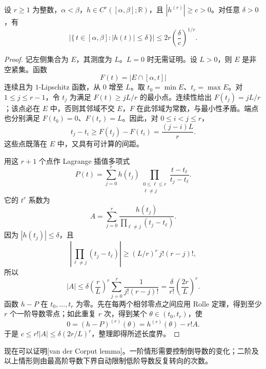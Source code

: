 \begin{lemma}[次水平集的长度]\label{b2:lem:21-sublevel-measure}
设 \(r\geq1\) 为整数，\(\alpha<\beta\)，\(h\in C^r([\alpha,\beta];\mathbb R)\)，且 \(|h^{(r)}|\geq c>0\)。对任意 \(\delta>0\)，有
\[
 \left|\{\,t\in[\alpha,\beta]:|h(t)|\leq\delta\,\}\right|
 \leq 2r\left(\frac{\delta}{c}\right)^{1/r}.
\]
\end{lemma}
\begin{proof}
记左侧集合为 \(E\)，其测度为 \(L\)。\(L=0\) 时无需证明。设 \(L>0\)，则 \(E\) 是非空紧集。函数
\[
 F(t)=|E\cap[\alpha,t]|
\]
连续且为 \(1\)-Lipschitz 函数，从 \(0\) 增至 \(L\)。取 \(t_0=\min E\)、\(t_r=\max E\)。对 \(1\leq j\leq r-1\)，令 \(t_j\) 为满足 \(F(t)\geq jL/r\) 的最小点。连续性给出 \(F(t_j)=jL/r\)；该点必在 \(E\) 中，否则其邻域不交 \(E\)，\(F\) 在此邻域为常数，与最小性矛盾。端点也分别满足 \(F(t_0)=0\)、\(F(t_r)=L\)。因此，对 \(0\leq i<j\leq r\)，
\[
 t_j-t_i\geq F(t_j)-F(t_i)=\frac{(j-i)L}{r}.
\]
这些点既落在 \(E\) 中，又具有可计算的间距。

用这 \(r+1\) 个点作 Lagrange 插值多项式
\[
 P(t)=\sum_{j=0}^r h(t_j)
       \prod_{\substack{0\leq\ell\leq r\\\ell\ne j}}
       \frac{t-t_\ell}{t_j-t_\ell}.
\]
它的 \(t^r\) 系数为
\[
 A=\sum_{j=0}^r
       \frac{h(t_j)}
       {\prod_{\ell\ne j}(t_j-t_\ell)}.
\]
因为 \(|h(t_j)|\leq\delta\)，且
\[
 \left|\prod_{\ell\ne j}(t_j-t_\ell)\right|
 \geq (L/r)^r\,j!(r-j)!,
\]
所以
\[
 |A|
 \leq\delta\left(\frac rL\right)^r
       \sum_{j=0}^r\frac1{j!(r-j)!}
 =\frac{\delta}{r!}\left(\frac{2r}{L}\right)^r.
\]
函数 \(h-P\) 在 \(t_0,\ldots,t_r\) 为零。先在每两个相邻零点之间应用 Rolle 定理，得到至少 \(r\) 个一阶导数零点；如此重复 \(r\) 次，得到某个 \(\theta\in(t_0,t_r)\)，使
\[
 0=(h-P)^{(r)}(\theta)
   =h^{(r)}(\theta)-r!A.
\]
于是 \(c\leq r!|A|\leq\delta(2r/L)^r\)，整理即得所述长度界。
\end{proof}

现在可以证明[van der Corput lemma]。一阶情形需要控制倒导数的变化；二阶及以上情形则由最高阶导数下界自动限制低阶导数反复转向的次数。

